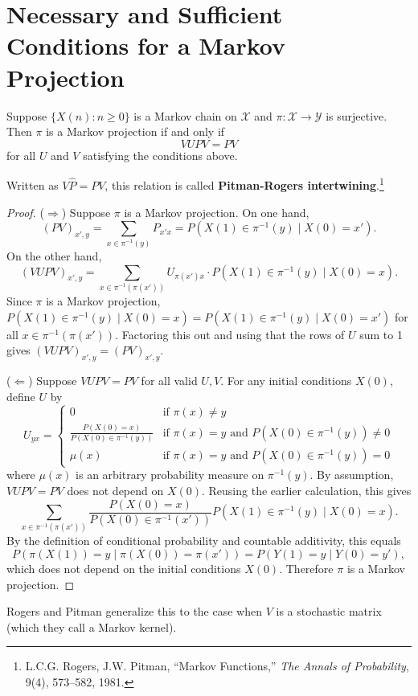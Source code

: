 \documentclass{ximera}
\begin{document}
\section*{Necessary and Sufficient Conditions for a Markov Projection}

\begin{theorem}
Suppose $\{X(n) : n \geq 0\}$ is a Markov chain on $\mathcal{X}$ and $\pi : \mathcal{X} \to \mathcal{Y}$ is surjective. Then $\pi$ is a Markov projection if and only if
\[
VUPV = PV
\]
for all $U$ and $V$ satisfying the conditions above.
\end{theorem}

\begin{remark}
Written as $V\hat{P} = PV$, this relation is called \textbf{Pitman-Rogers intertwining}.\footnote{L.C.G. Rogers, J.W. Pitman, ``Markov Functions,'' \textit{The Annals of Probability}, 9(4), 573--582, 1981.}
\end{remark}

\begin{proof}
($\Rightarrow$) Suppose $\pi$ is a Markov projection. On one hand,
\[
(PV)_{x',y} = \sum_{x \in \pi^{-1}(y)} P_{x'x} = P(X(1) \in \pi^{-1}(y) \mid X(0) = x').
\]
On the other hand,
\[
(VUPV)_{x',y} = \sum_{x \in \pi^{-1}(\pi(x'))} U_{\pi(x')x} \cdot P(X(1) \in \pi^{-1}(y) \mid X(0) = x).
\]
Since $\pi$ is a Markov projection, $P(X(1) \in \pi^{-1}(y) \mid X(0) = x) = P(X(1) \in \pi^{-1}(y) \mid X(0) = x')$ for all $x \in \pi^{-1}(\pi(x'))$. Factoring this out and using that the rows of $U$ sum to 1 gives $(VUPV)_{x',y} = (PV)_{x',y}$.

($\Leftarrow$) Suppose $VUPV = PV$ for all valid $U, V$. For any initial conditions $X(0)$, define $U$ by
\[
U_{yx} = \begin{cases} 0 & \text{if } \pi(x) \neq y \\ \frac{P(X(0)=x)}{P(X(0) \in \pi^{-1}(y))} & \text{if } \pi(x) = y \text{ and } P(X(0) \in \pi^{-1}(y)) \neq 0 \\ \mu(x) & \text{if } \pi(x) = y \text{ and } P(X(0) \in \pi^{-1}(y)) = 0 \end{cases}
\]
where $\mu(x)$ is an arbitrary probability measure on $\pi^{-1}(y)$. By assumption, $VUPV = PV$ does not depend on $X(0)$. Reusing the earlier calculation, this gives
\[
\sum_{x \in \pi^{-1}(\pi(x'))} \frac{P(X(0)=x)}{P(X(0) \in \pi^{-1}(x'))} P(X(1) \in \pi^{-1}(y) \mid X(0) = x).
\]
By the definition of conditional probability and countable additivity, this equals
\[
P(\pi(X(1)) = y \mid \pi(X(0)) = \pi(x')) = P(Y(1) = y \mid Y(0) = y'),
\]
which does not depend on the initial conditions $X(0)$. Therefore $\pi$ is a Markov projection.
\end{proof}

\begin{remark}
Rogers and Pitman generalize this to the case when $V$ is a stochastic matrix (which they call a Markov kernel).
\end{remark}
\end{document}
